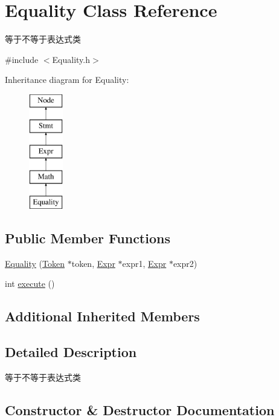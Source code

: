 \hypertarget{class_equality}{}\section{Equality Class Reference}
\label{class_equality}


等于不等于表达式类  




{\ttfamily \#include $<$Equality.\+h$>$}

Inheritance diagram for Equality\+:\begin{figure}[H]
\begin{center}
\leavevmode
\includegraphics[height=5.000000cm]{class_equality}
\end{center}
\end{figure}
\subsection*{Public Member Functions}
\begin{DoxyCompactItemize}
\item 
\hyperlink{class_equality_afe12b1491ae42b80d41a8355bfe3197c}{Equality} (\hyperlink{class_token}{Token} $\ast$token, \hyperlink{class_expr}{Expr} $\ast$expr1, \hyperlink{class_expr}{Expr} $\ast$expr2)
\item 
int \hyperlink{class_equality_a0255c33af70613b006b03a329ed329ff}{execute} ()
\end{DoxyCompactItemize}
\subsection*{Additional Inherited Members}


\subsection{Detailed Description}
等于不等于表达式类 

\subsection{Constructor \& Destructor Documentation}
\mbox{\label{class_equality_afe12b1491ae42b80d41a8355bfe3197c}} 
